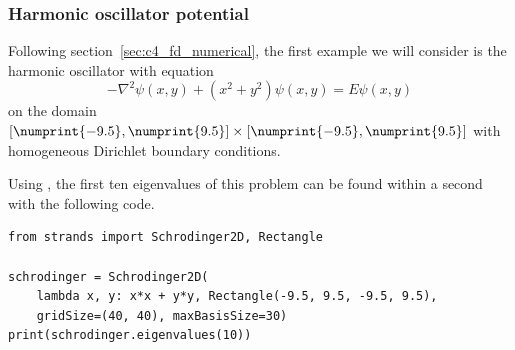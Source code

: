 \subsubsection{Harmonic oscillator potential}\label{sec:c4_numerical_harmonic}

Following section~\ref{sec:c4_fd_numerical}, the first example we will consider is the harmonic oscillator with equation
\begin{equation}\label{equ:c4_nm_harmonic}
    -\nabla^2 \psi(x, y) + \left(x^2 + y^2\right) \psi(x, y) = E \psi(x, y)
\end{equation}
on the domain $[\numprint{-9.5}, \numprint{9.5}] \times [\numprint{-9.5}, \numprint{9.5}]$ with homogeneous Dirichlet boundary conditions.

Using \strands{}, the first ten eigenvalues of this problem can be found within a second with the following code.
\begin{verbatim}
from strands import Schrodinger2D, Rectangle

schrodinger = Schrodinger2D(
    lambda x, y: x*x + y*y, Rectangle(-9.5, 9.5, -9.5, 9.5),
    gridSize=(40, 40), maxBasisSize=30)
print(schrodinger.eigenvalues(10))
\end{verbatim}


